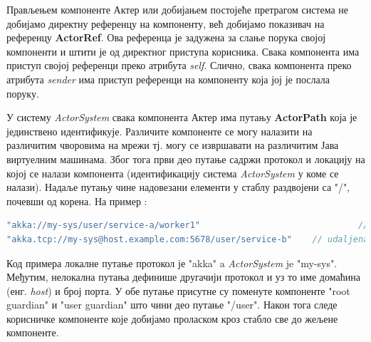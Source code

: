 \documentclass[12pt,oneside]{memoir}
\begin{document}
Прављењем компоненте Актер или добијањем постојеће претрагом система не добијамо директну референцу на компоненту, већ добијамо показивач на референцу \textbf{ActorRef}. Ова референца је задужена за слање порука својој компоненти и штити је од директног приступа корисника. Свака компонента има приступ својој референци преко атрибута \textit{self}. Слично, свака компонента преко атрибута \textit{sender} има приступ референци на компоненту која јој је послала поруку.

У систему \textit{ActorSystem} свака компонента Актер има путању \textbf{ActorPath} која је јединствено идентификује. Различите компоненте се могу налазити на различитим чворовима на мрежи тј. могу се извршавати на различитим Јава виртуелним машинама. Због тога први део путање садржи протокол и локацију на којој се налази компонента (идентификацију система \textit{ActorSystem} у коме се налази). Надаље путању чине надовезани елементи у стаблу раздвојени са "/", почевши од корена. На пример \cite{akkaDoc}:
\begin{lstlisting}[language=Scala]
"akka://my-sys/user/service-a/worker1"                  		   	 // lokalna komponenta
"akka.tcp://my-sys@host.example.com:5678/user/service-b" 	// udaljena komponenta
\end{lstlisting}
Код примера локалне путање протокол је "akka" a \textit{ActorSystem} je "my-sys". Међутим, нелокална путања дефинише другачији протокол и уз то име домаћина (енг. \textit{host}) и број порта. У обе путање присутне су поменуте компоненте "root guardian" и "user guardian" што чини део путање "/user". Након тога следе корисничке компоненте које добијамо проласком кроз стабло све до жељене компоненте.
\end{document}
